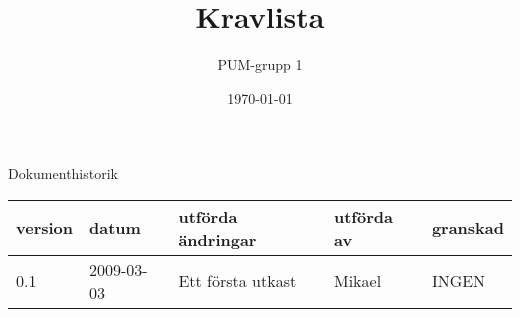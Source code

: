 

\ifpdf
\else
\fi

\title{Kravlista}
\author{PUM-grupp 1}
\date{\today}



\maketitle\thispagestyle{empty}

\newpage

{\centering \Large{Dokumenthistorik\\}}

\vspace{10pt}
\begin{tabularx}{\textwidth}{ |l|l|X|l|l| }
  \hline
    \textbf{version} & \textbf{datum} & \textbf{utförda ändringar} & \textbf{utförda av} & \textbf{granskad} \\
	\hline 
  0.1 & 2009-03-03 &  Ett första utkast  & Mikael & INGEN \\
  \hline
\end{tabularx}

\newpage

\setcounter{tocdepth}{2}
\tableofcontents
\newpage

